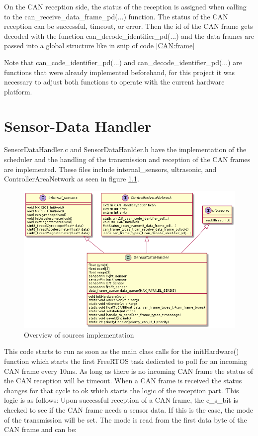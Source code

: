 \documentclass[12pt]{report}%
\begin{document}
On the CAN reception side, the status of the reception is assigned when calling to the can\_receive\_data\_frame\_pd(...) function. The status of the CAN reception can be successful, timeout, or error. Then the id of the CAN frame gets decoded with the function can\_decode\_identifier\_pd(...) and the data frames are passed into a global structure like in snip of code \ref{CAN:frame}

Note that can\_code\_identifier\_pd(...) and can\_decode\_identifier\_pd(...) are functions that were already implemented beforehand, for this project it was necessary to adjust both functions to operate with the current hardware platform.

\chapter{Sensor-Data Handler}
\label{chap:sensor}
SensorDataHandler.c and SensorDataHanlder.h have the implementation of the scheduler and the handling of the transmission and reception of the CAN frames are implemented. These files include internal\_sensors, ultrasonic, and ControllerAreaNetwork as seen in figure \ref{fig:class}.

\begin{figure}[ht]
	\centering
	\includegraphics[width=\textwidth]{class}
    \caption{Overview of sources implementation}
    \label{fig:class}
\end{figure}

This code starts to run as soon as the main class calls for the initHardware() function which starts the first FreeRTOS task dedicated to poll for an incoming CAN frame every 10ms. As long as there is no incoming CAN frame the status of the CAN reception will be timeout. When a CAN frame is received the status changes for that cycle to ok which starts the logic of the reception part. This logic is as follows: Upon successful reception of a CAN frame, the c\_s\_bit is checked to see if the CAN frame needs a sensor data. If this is the case, the mode of the transmission will be set. The mode is read from the first data byte of the CAN frame and can be:
\end{document}
